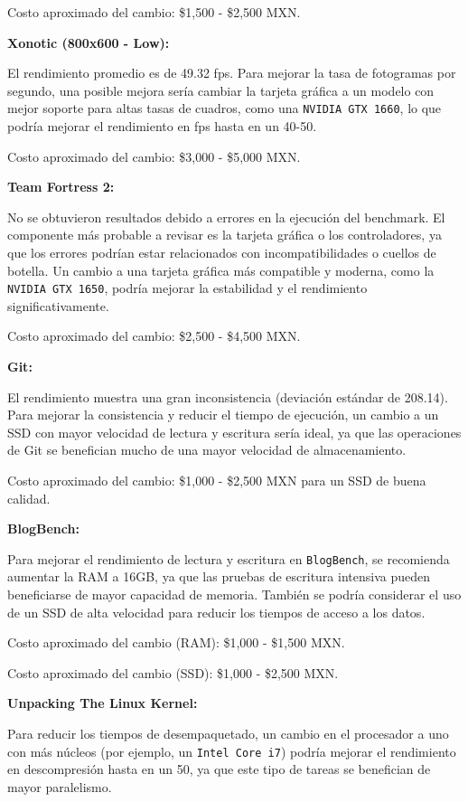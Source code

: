\documentclass[12pt]{article}
\begin{document}
\begin{enumerate}[label=(\arabic{section}.\arabic{subsection}.\arabic{enumi})]
Costo aproximado del cambio:  \$1,500 -  \$2,500 MXN.

\textbf{Xonotic (800x600 - Low):}

El rendimiento promedio es de 49.32 fps. Para mejorar la tasa de fotogramas por segundo, una posible mejora sería cambiar la tarjeta gráfica a un modelo con mejor soporte para altas tasas de cuadros, como una \texttt{NVIDIA GTX 1660}, lo que podría mejorar el rendimiento en fps hasta en un 40-50.

Costo aproximado del cambio:  \$3,000 -  \$5,000 MXN.

\textbf{Team Fortress 2:}

No se obtuvieron resultados debido a errores en la ejecución del benchmark. El componente más probable a revisar es la tarjeta gráfica o los controladores, ya que los errores podrían estar relacionados con incompatibilidades o cuellos de botella. Un cambio a una tarjeta gráfica más compatible y moderna, como la \texttt{NVIDIA GTX 1650}, podría mejorar la estabilidad y el rendimiento significativamente.

Costo aproximado del cambio:  \$2,500 -  \$4,500 MXN.

\textbf{Git:}

El rendimiento muestra una gran inconsistencia (deviación estándar de 208.14). Para mejorar la consistencia y reducir el tiempo de ejecución, un cambio a un SSD con mayor velocidad de lectura y escritura sería ideal, ya que las operaciones de Git se benefician mucho de una mayor velocidad de almacenamiento.

Costo aproximado del cambio:  \$1,000 -  \$2,500 MXN para un SSD de buena calidad.

\textbf{BlogBench:}

Para mejorar el rendimiento de lectura y escritura en \texttt{BlogBench}, se recomienda aumentar la RAM a 16GB, ya que las pruebas de escritura intensiva pueden beneficiarse de mayor capacidad de memoria. También se podría considerar el uso de un SSD de alta velocidad para reducir los tiempos de acceso a los datos.

Costo aproximado del cambio (RAM):  \$1,000 -  \$1,500 MXN.

Costo aproximado del cambio (SSD):  \$1,000 -  \$2,500 MXN.

\textbf{Unpacking The Linux Kernel:}

Para reducir los tiempos de desempaquetado, un cambio en el procesador a uno con más núcleos (por ejemplo, un \texttt{Intel Core i7}) podría mejorar el rendimiento en descompresión hasta en un 50, ya que este tipo de tareas se benefician de mayor paralelismo.


\end{enumerate}
\end{document}
